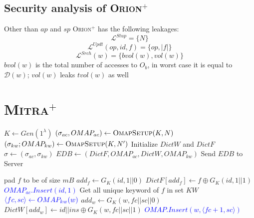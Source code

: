\documentclass[sigconf]{acmart}
\newcommand{\pair}[2]{{\langle \ensuremath{#1, #2} \rangle}}
\newcommand{\DB}[1]{\mathcal{D}(#1)}
\newcommand{\vol}[1]{\lvert{#1}\rvert}
\newcommand{\Mitrap}{\textsc{Mitra}$^{+}$ }
\newcommand{\Orionp}{\textsc{Orion}$^{+}$ }
\newcommand{\tblue}[1]{\textcolor{blue}{#1}}
\begin{document}
\subsection{Security analysis of \Orionp}
Other than $ap$ and $sp$ \Orionp has the following leakages:
$$\mathcal{L}^{Stup} = \{N\}$$
$$\mathcal{L}^{Updt}(op,id,f) = \{op,\vol{f}\}$$
$$\mathcal{L}^{Srch}(w) = \{bvol(w),vol(w)\}$$
$bvol(w)$ is the total number of accesses to $O_{b}$, in worst case it is equal to $\DB{w}$;
$vol(w)$ leaks $tvol(w)$ as well

\section{\Mitrap}



\begin{algorithm}
\caption{\Mitrap$(K,\sigma;EDB)$ $\leftarrow$ Setup($\lambda$,DB)}\label{mitap:setup}
\begin{algorithmic}[1]
\State $K \gets Gen(1^{\lambda})$
\State $(\sigma_{ac},OMAP_{ac}) \gets \textsc{OmapSetup}(K,N)$
\State $(\sigma_{kw};OMAP_{kw})\gets \textsc{OmapSetup}(K,N'
)$
\State Initialize $DictW$ and $DictF$
\State $\sigma \gets (\sigma_{ac},\sigma_{kw})$
\State $EDB \gets  (DictF,OMAP_{ac},DictW,OMAP_{kw})$
\State Send $EDB$ to Server
\end{algorithmic}
\end{algorithm}
\label{Algo:Mitra+Setup}


\begin{algorithm}[tbh]
\caption{\Mitrap $(K,\sigma';EDB')$ $\leftrightarrow$ $Insert(K,op,\pair{id}{f},\sigma;EDB)$}\label{alg:orionplusInsert}
\begin{algorithmic}[1]
\State pad $f$ to be of size $mB$ 
\State $add_f \gets G_K(id,1||0)$
\State $DictF[add_f] \gets f \oplus G_K(id,1||1)$
\State \tblue{$OMAP_{ac}.Insert(id,1)$}
\State Get all unique keyword of $f$ in set $KW$
\State $\tblue{\pair{fc}{sc} \gets OMAP_{kw}(w)}$
\State $add_w \gets G_K(w,fc||sc||0)$
\State $DictW[add_w] \gets id||ins \oplus G_K(w,fc||sc||1)$
\State \tblue{$OMAP.Insert(w,\pair{fc+1}{sc})$}
\EndFor
\end{algorithmic}
\end{algorithm}
\label{Algo:Mitra+Update}
\end{document}
